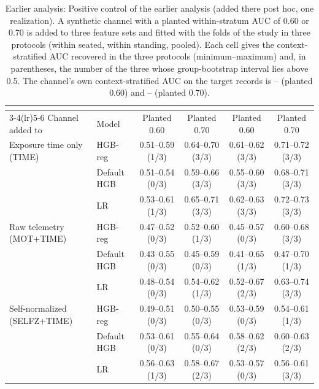 \begin{table}[t]
\centering
\footnotesize
\caption{Earlier analysis: Positive control of the earlier analysis (added there post hoc, one realization). A synthetic channel with a planted within-stratum AUC of 0.60 or 0.70 is added to three feature sets and fitted with the folds of the study in three protocols (within seated, within standing, pooled). Each cell gives the context-stratified AUC recovered in the three protocols (minimum--maximum) and, in parentheses, the number of the three whose group-bootstrap interval lies above 0.5. The channel's own context-stratified AUC on the target records is -- (planted 0.60) and -- (planted 0.70).}
\label{tab:supp_posctl}
\setlength{\tabcolsep}{4pt}
\begin{tabular}{@{}llcccc@{}}
\toprule
 & & \multicolumn{2}{c}{\sevtwo{}} & \multicolumn{2}{c}{\sevone{}} \\ \cmidrule(lr){3-4}\cmidrule(lr){5-6}
Channel added to & Model & Planted 0.60 & Planted 0.70 & Planted 0.60 & Planted 0.70 \\
\midrule
Exposure time only (TIME) & HGB-reg & 0.51--0.59 (1/3) & 0.64--0.70 (3/3) & 0.61--0.62 (3/3) & 0.71--0.72 (3/3) \\
 & Default HGB & 0.51--0.54 (0/3) & 0.59--0.66 (3/3) & 0.55--0.60 (3/3) & 0.68--0.71 (3/3) \\
 & LR & 0.53--0.61 (1/3) & 0.65--0.71 (3/3) & 0.62--0.63 (3/3) & 0.72--0.73 (3/3) \\
Raw telemetry (MOT+TIME) & HGB-reg & 0.47--0.52 (0/3) & 0.52--0.60 (1/3) & 0.45--0.57 (0/3) & 0.60--0.68 (3/3) \\
 & Default HGB & 0.43--0.55 (0/3) & 0.45--0.59 (0/3) & 0.41--0.65 (1/3) & 0.47--0.70 (1/3) \\
 & LR & 0.48--0.54 (0/3) & 0.54--0.62 (1/3) & 0.52--0.67 (2/3) & 0.63--0.74 (3/3) \\
Self-normalized (SELFZ+TIME) & HGB-reg & 0.49--0.51 (0/3) & 0.50--0.55 (0/3) & 0.53--0.59 (0/3) & 0.54--0.61 (1/3) \\
 & Default HGB & 0.53--0.61 (0/3) & 0.55--0.64 (0/3) & 0.58--0.62 (2/3) & 0.60--0.63 (2/3) \\
 & LR & 0.56--0.63 (1/3) & 0.58--0.67 (2/3) & 0.53--0.57 (0/3) & 0.56--0.61 (3/3) \\
\bottomrule
\end{tabular}
\end{table}